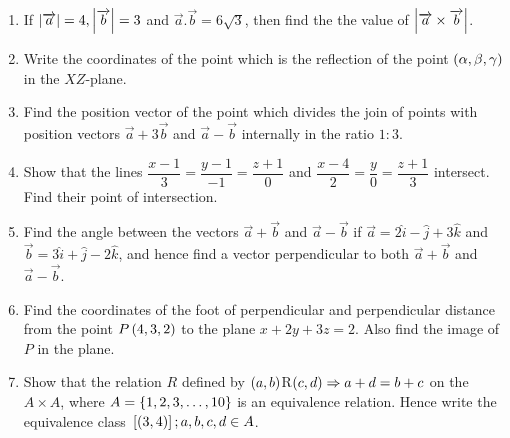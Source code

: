 \begin{enumerate}
	\item If $\left\vert\overrightarrow{a}\right\vert = 4, \left\vert\overrightarrow{b}\right\vert = 3$ and $ \overrightarrow{a}.\overrightarrow{b} = 6\sqrt{3}$, then find the the value of $\left\vert\overrightarrow{a}\times \overrightarrow{b}\right\vert$.
	\item Write the coordinates of the point which is the reflection of the point $\left(\alpha,\beta,\gamma\right)$ in the $XZ$-plane.
	\item Find the position vector of the point which divides the join of points with position vectors $\overrightarrow{a} + 3\overrightarrow{b}$ and $\overrightarrow{a} - \overrightarrow{b}$ internally in the ratio $1:3$.
	\item Show that the lines $\dfrac{x-1}{3} = \dfrac{y-1}{-1} = \dfrac{z+1}{0}$ and $ \dfrac{x-4}{2} = \dfrac{y}{0} = \dfrac{z+1}{3}$ intersect. Find their point of intersection.
	\item Find the angle between the vectors $ \overrightarrow{a} + \overrightarrow{b} $ and $ \overrightarrow{a} - \overrightarrow{b} $ if $ \overrightarrow{a} = 2\hat{i} - \hat{j} +3\hat{k} $ and $ \overrightarrow{b} = 3\hat{i} + \hat{j} - 2\hat{k}$, and hence find a vector perpendicular to both $ \overrightarrow{a} + \overrightarrow{b} $ and $\overrightarrow{a} - \overrightarrow{b}$.
	\item Find the coordinates of the foot of perpendicular and perpendicular distance from the point $P\left(4,3,2\right)$ to the plane $x + 2y + 3z = 2$. Also find the image of $P$ in the plane.
	\item Show that the relation $R$ defined by $\left(a,b\right)$R$\left(c,d\right) \Rightarrow a + d = b + c$ on the $A\times A$, where $A = \left\{1,2,3,\ldots,10\right\}$ is an equivalence relation. Hence write the equivalence class ${}\left[\left(3,4\right)\right]; a,b,c,d \in A$.

\end{enumerate}
